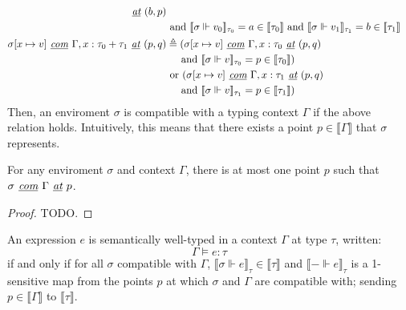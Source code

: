 \begin{definition}
\begin{equation}
\begin{normalsize}
\begin{aligned}[c]
        \textit{ \underline{at} } (b, p) \\
      & \text{ and } \llbracket \sigma \Vdash v_0 \rrbracket_{\tau_0} = a \in
          \llbracket \tau_0 \rrbracket
        \text{ and } \llbracket \sigma \Vdash v_1 \rrbracket_{\tau_1} = b \in
          \llbracket \tau_1 \rrbracket \\
      \sigma[x \mapsto v] \textit{ \underline{com} } \Gamma, x : \tau_0 + \tau_1 \textit{ \underline{at} } (p, q)
      &\triangleq 
      (\sigma[x \mapsto v] \textit{ \underline{com} } \Gamma, x : \tau_0
      \textit{ \underline{at} } (p, q) \\
      &\> \> \> \> \> \text{ and } \llbracket \sigma \Vdash v \rrbracket_{\tau_0} = p
      \in \llbracket \tau_0 \rrbracket) \\
      & \text{ or } (\sigma[x \mapsto v] \textit{ \underline{com} } \Gamma, x :
      \tau_1 \textit{ \underline{at} } (p, q) \\
      &\> \> \> \> \> \text{ and } \llbracket \sigma \Vdash v \rrbracket_{\tau_1} = p
      \in \llbracket \tau_1 \rrbracket) \\
    \end{aligned}
    \end{normalsize}
  \end{equation}
  Then, an enviroment $\sigma$ is compatible with a typing context $\Gamma$ if
  the above relation holds. Intuitively, this means that there exists a point $p
  \in \llbracket \Gamma \rrbracket$ that $\sigma$ represents.
\end{definition}

\begin{theorem}
  For any enviroment $\sigma$ and context $\Gamma$, there is at most one point
  $p$ such that $\sigma \textit{ \underline{com} } \Gamma \textit {
    \underline{at} } p$.
\end{theorem}
\begin{proof}
  TODO.
\end{proof}

\begin{definition}
  An expression $e$ is semantically well-typed in a context $\Gamma$ at type
  $\tau$, written:
  $$\Gamma \vDash e : \tau$$
  if and only if for all $\sigma$ compatible with $\Gamma$, $\llbracket \sigma
  \Vdash e \rrbracket_{\tau} \in \llbracket \tau \rrbracket$ and $\llbracket -
  \Vdash e \rrbracket_{\tau}$ is a 1-sensitive map from the points $p$ at which
  $\sigma$ and $\Gamma$ are compatible with; sending $p \in \llbracket \Gamma
  \rrbracket$ to $\llbracket \tau \rrbracket$.
\end{definition}

